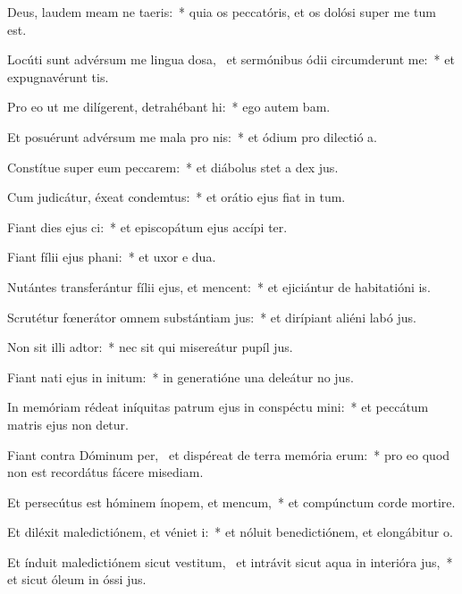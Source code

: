 \item Deus, laudem meam ne taeris:~* quia os peccatóris, et os dolósi super me tum est.
\item Locúti sunt advérsum me lingua dosa,~\pscross{} et sermónibus ódii circumderunt me:~* et expugnavérunt  tis.
\item Pro eo ut me dilígerent, detrahébant hi:~* ego autem bam.
\item Et posuérunt advérsum me mala pro nis:~* et ódium pro dilectió a.
\item Constítue super eum peccarem:~* et diábolus stet a dex jus.
\item Cum judicátur, éxeat condemtus:~* et orátio ejus fiat in tum.
\item Fiant dies ejus ci:~* et episcopátum ejus accípi ter.
\item Fiant fílii ejus phani:~* et uxor e dua.
\item Nutántes transferántur fílii ejus, et mencent:~* et ejiciántur de habitatióni is.
\item Scrutétur fœnerátor omnem substántiam jus:~* et dirípiant aliéni labó jus.
\item Non sit illi adtor:~* nec sit qui misereátur pupíl jus.
\item Fiant nati ejus in initum:~* in generatióne una deleátur no jus.
\item In memóriam rédeat iníquitas patrum ejus in conspéctu mini:~* et peccátum matris ejus non detur.
\item Fiant contra Dóminum per,~\pscross{} et dispéreat de terra memória erum:~* pro eo quod non est recordátus fácere misediam.
\item Et persecútus est hóminem ínopem, et mencum,~* et compúnctum corde mortire.
\item Et diléxit maledictiónem, et véniet i:~* et nóluit benedictiónem, et elongábitur  o.
\item Et índuit maledictiónem sicut vestitum,~\pscross{} et intrávit sicut aqua in interióra jus,~* et sicut óleum in óssi jus.
